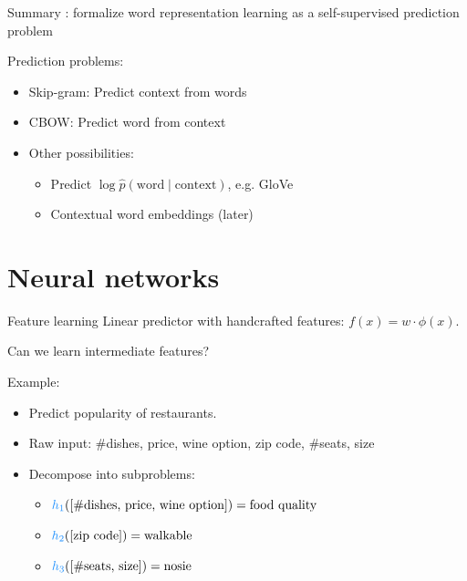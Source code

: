 \documentclass[usenames,dvipsnames,notes,11pt,aspectratio=169]{beamer}
\begin{document}
\begin{frame}
    {Summary}
    : formalize word representation learning as a self-supervised prediction problem

    Prediction problems:\\
    \begin{itemize}
        \item Skip-gram: Predict context from words
        \item CBOW: Predict word from context
        \item Other possibilities:
            \begin{itemize}
                \item Predict $\log \hat{p} (\text{word}\mid \text{context})$, e.g. GloVe
                \item Contextual word embeddings (later)
            \end{itemize}
    \end{itemize}

\end{frame}


\section{Neural networks}

\begin{frame}
    {Feature learning}
    Linear predictor with handcrafted features: $f(x) = w\cdot\phi(x)$.

    Can we learn intermediate features?
    \pause

    Example:\\
    \begin{itemize}
    \item Predict popularity of restaurants.
    \item Raw input: \#dishes, price, wine option, zip code, \#seats, size 
    \item Decompose into subproblems:
    \begin{itemize}
        \itemsep2ex
    \item[] ${\color{blue}h_1}(\pb{\text{\#dishes, price, wine option}}) = \text{food quality}$
    \item[] ${\color{blue}h_2}(\pb{\text{zip code}}) = \text{walkable}$
    \item[] ${\color{blue}h_3}(\pb{\text{\#seats, size}}) = \text{nosie}$
    \end{itemize}
    \end{itemize}

\end{frame}
\end{document}

